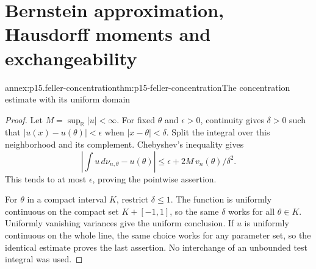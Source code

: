 \section{Bernstein approximation, Hausdorff moments and exchangeability}
\label{sec:annex-p15-feller-bernstein-hausdorff}

\begin{annexitem}{annex:p15.feller-concentration}{thm:p15-feller-concentration}{The concentration estimate with its uniform domain}
\begin{proof}
Let \(M=\sup_{\mathbb R}|u|<\infty\).
For fixed \(\theta\) and \(\epsilon>0\), continuity gives
\(\delta>0\) such that \(|u(x)-u(\theta)|<\epsilon\) when
\(|x-\theta|<\delta\). Split the integral over this neighborhood
and its complement. Chebyshev's inequality gives
\[
 \left|\int u\,d\nu_{n,\theta}-u(\theta)\right|
       \leq\epsilon+2M\,v_n(\theta)/\delta^2.
\]
This tends to at most \(\epsilon\), proving the pointwise assertion.

For \(\theta\) in a compact interval \(K\), restrict \(\delta\leq1\).
The function is uniformly continuous on the compact set
\(K+[-1,1]\), so the same \(\delta\) works for all \(\theta\in K\).
Uniformly vanishing variances give the uniform conclusion.
If \(u\) is uniformly continuous on the whole line, the same choice
works for any parameter set, so the identical estimate proves the
last assertion. No interchange of an unbounded test integral was used.
\end{proof}
\end{annexitem}

